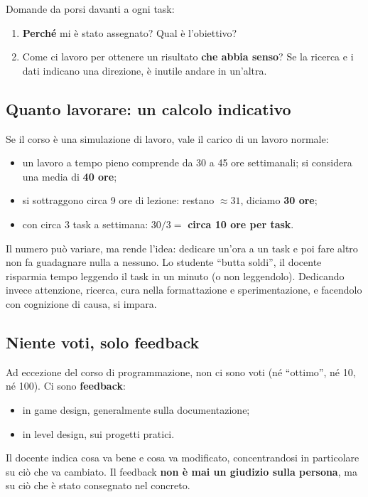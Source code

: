 Domande da porsi davanti a ogni task:
\begin{enumerate}
  \item \textbf{Perché} mi è stato assegnato? Qual è l'obiettivo?
  \item Come ci lavoro per ottenere un risultato \textbf{che abbia senso}? Se
        la ricerca e i dati indicano una direzione, è inutile andare in
        un'altra.
\end{enumerate}

\subsection{Quanto lavorare: un calcolo indicativo}

Se il corso è una simulazione di lavoro, vale il carico di un lavoro normale:
\begin{itemize}
  \item un lavoro a tempo pieno comprende da 30 a 45 ore settimanali; si
        considera una media di \textbf{40 ore};
  \item si sottraggono circa 9 ore di lezione: restano $\approx 31$, diciamo
        \textbf{30 ore};
  \item con circa 3 task a settimana: $30 / 3 = $ \textbf{circa 10 ore per
        task}.
\end{itemize}
Il numero può variare, ma rende l'idea: dedicare un'ora a un task e poi fare
altro non fa guadagnare nulla a nessuno. Lo studente ``butta soldi'', il
docente risparmia tempo leggendo il task in un minuto (o non leggendolo).
Dedicando invece attenzione, ricerca, cura nella formattazione e
sperimentazione, e facendolo con cognizione di causa, si impara.

\subsection{Niente voti, solo feedback}

Ad eccezione del corso di programmazione, non ci sono voti (né ``ottimo'', né
10, né 100). Ci sono \textbf{feedback}:
\begin{itemize}
  \item in game design, generalmente sulla documentazione;
  \item in level design, sui progetti pratici.
\end{itemize}
Il docente indica cosa va bene e cosa va modificato, concentrandosi in
particolare su ciò che va cambiato. Il feedback \textbf{non è mai un giudizio
sulla persona}, ma su ciò che è stato consegnato nel concreto.

